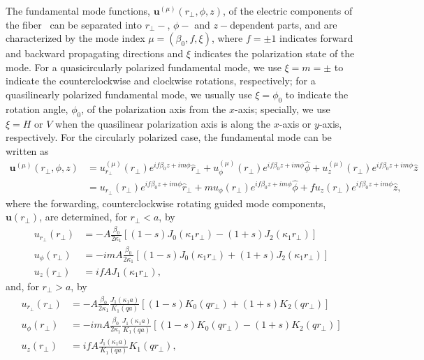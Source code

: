 \documentclass[preprint,aps,pra,onecolumn]{revtex4-1} %
\begin{document}
The fundamental mode functions, $\mathbf{u}^{(\mu)}(r\!_\perp,\phi,z)$, of the electric components of the fiber~\cite{LeKien2005,Lacroute2012} can be separated into $r\!_\perp-$, $\phi-$ and $z-$dependent parts, and are characterized by the mode index $\mu=(\beta_0,f,\xi)$, where $f=\pm 1$ indicates forward and backward propagating directions and $\xi $ indicates the polarization state of the mode. For a quasicircularly polarized fundamental mode, we use $\xi=m=\pm $ to indicate the counterclockwise and clockwise rotations, respectively; for a quasilinearly polarized fundamental mode, we usually use $\xi=\phi_0$ to indicate the rotation angle, $\phi_0$, of the polarization axis from the $x$-axis; specially, we use $\xi=H$ or $V$ when the quasilinear polarization axis is along the $x$-axis or $y$-axis, respectively. For the circularly polarized case, the fundamental mode can be written as 
\begin{align}
\mathbf{u}^{(\mu)}(r\!_\perp,\phi,z) &=u^{(\mu)}_{r\!_\perp}(r\!_\perp) e^{if\beta_0 z+im\phi }\hat{r}\!_\perp +u^{(\mu)}_{\phi}(r\!_\perp) e^{if\beta_0 z+im\phi } \hat{\phi} +u^{(\mu)}_{z}(r\!_\perp)e^{if\beta_0 z+im\phi }\hat{z}\\
&=u_{r\!_\perp}(r\!_\perp) e^{if\beta_0 z+im\phi }\hat{r}\!_\perp + m u_{\phi}(r\!_\perp) e^{if\beta_0 z+im\phi }\hat{\phi} + f u_z (r\!_\perp) e^{if\beta_0 z+im\phi }\hat{z},
\end{align}
where the forwarding, counterclockwise rotating guided mode components, $\mathbf{u}(r\!_\perp)$, are determined, for $r\!_\perp<a$, by
\begin{subequations}
\label{urtcrla}
\begin{align}
u_{r\!_\perp}(r\!_\perp) &=-A\frac{\beta_0}{2\kappa_1} \left[ (1-s)J_0(\kappa_1r\!_\perp)-(1+s)J_2(\kappa_1r\!_\perp) \right]\\
u_\phi(r\!_\perp) &=  -imA \frac{\beta_0}{2\kappa_1} \left[ (1-s)J_0(\kappa_1r\!_\perp) +(1+s)J_2(\kappa_1r\!_\perp) \right] \\
u_z(r\!_\perp) &= ifA J_1(\kappa_1r\!_\perp),
\end{align}
\end{subequations}
and, for $ r_\perp>a $, by
\begin{subequations}
\label{urtcrga}
\begin{align}
u_{r\!_\perp}(r\!_\perp) &=-A\frac{\beta_0}{2\kappa_1}\frac{J_1(\kappa_1a)}{K_1(qa)} \left[ (1-s)K_0(qr\!_\perp)+(1+s)K_2(qr\!_\perp) \right]\\
u_\phi(r\!_\perp) &=  -imA \frac{\beta_0}{2\kappa_1} \frac{J_1(\kappa_1a)}{K_1(qa)} \left[ (1-s)K_0(qr\!_\perp) - (1+s)K_2(qr\!_\perp) \right] \\
u_z(r\!_\perp) &= ifA \frac{J_1(\kappa_1a)}{K_1(qa)} K_1(qr\!_\perp),
\end{align}
\end{subequations}
\end{document}

